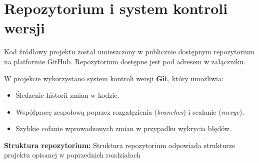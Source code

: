 \section{Repozytorium i system kontroli wersji}

Kod źródłowy projektu został umieszczony w publicznie dostępnym repozytorium na platformie GitHub. Repozytorium dostępne jest pod adresem w załączniku.


W projekcie wykorzystano system kontroli wersji \textbf{Git}, który umożliwia:
\begin{itemize}
    \item Śledzenie historii zmian w kodzie.
    \item Współpracę zespołową poprzez rozgałęzienia (\textit{branches}) i scalanie (\textit{merge}).
    \item Szybkie cofanie wprowadzonych zmian w przypadku wykrycia błędów.
\end{itemize}

\textbf{Struktura repozytorium:}  
Struktura repozytorium odpowiada strukturze projektu opisanej w poprzednich rozdziałach

